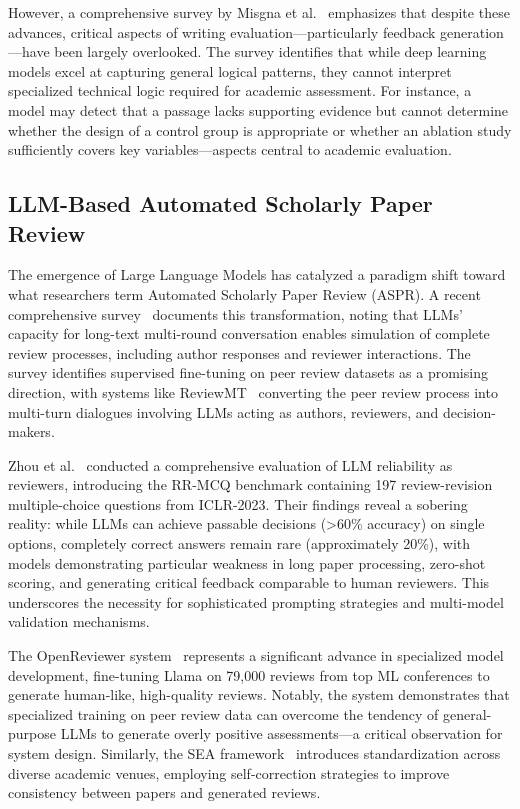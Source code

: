 However, a comprehensive survey by Misgna et al.~\cite{misgna2024survey} emphasizes that despite these advances, critical aspects of writing evaluation—particularly feedback generation—have been largely overlooked. The survey identifies that while deep learning models excel at capturing general logical patterns, they cannot interpret specialized technical logic required for academic assessment. For instance, a model may detect that a passage lacks supporting evidence but cannot determine whether the design of a control group is appropriate or whether an ablation study sufficiently covers key variables—aspects central to academic evaluation.

\subsection{LLM-Based Automated Scholarly Paper Review}

The emergence of Large Language Models has catalyzed a paradigm shift toward what researchers term Automated Scholarly Paper Review (ASPR). A recent comprehensive survey~\cite{tan2025llm} documents this transformation, noting that LLMs' capacity for long-text multi-round conversation enables simulation of complete review processes, including author responses and reviewer interactions. The survey identifies supervised fine-tuning on peer review datasets as a promising direction, with systems like ReviewMT~\cite{tan2024reviewmt} converting the peer review process into multi-turn dialogues involving LLMs acting as authors, reviewers, and decision-makers.

Zhou et al.~\cite{zhou2024llm} conducted a comprehensive evaluation of LLM reliability as reviewers, introducing the RR-MCQ benchmark containing 197 review-revision multiple-choice questions from ICLR-2023. Their findings reveal a sobering reality: while LLMs can achieve passable decisions (>60\% accuracy) on single options, completely correct answers remain rare (approximately 20\%), with models demonstrating particular weakness in long paper processing, zero-shot scoring, and generating critical feedback comparable to human reviewers. This underscores the necessity for sophisticated prompting strategies and multi-model validation mechanisms.

The OpenReviewer system~\cite{openreviewer2024} represents a significant advance in specialized model development, fine-tuning Llama on 79,000 reviews from top ML conferences to generate human-like, high-quality reviews. Notably, the system demonstrates that specialized training on peer review data can overcome the tendency of general-purpose LLMs to generate overly positive assessments—a critical observation for system design. Similarly, the SEA framework~\cite{sea2024} introduces standardization across diverse academic venues, employing self-correction strategies to improve consistency between papers and generated reviews.

